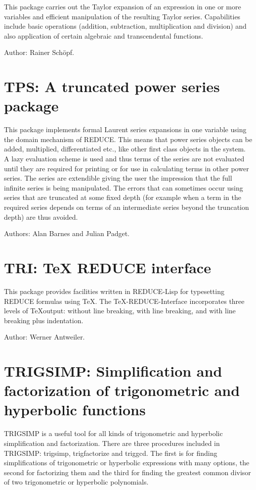 This package carries out the Taylor expansion of an expression in one or
more variables and efficient manipulation of the resulting Taylor series.
Capabilities include basic operations (addition, subtraction,
multiplication and division) and also application of certain algebraic and
transcendental functions.

Author: Rainer Sch\"opf.



\section{TPS: A truncated power series package}  

This package implements formal Laurent series expansions in one variable
using the domain mechanism of REDUCE.  This means that power series
objects can be added, multiplied, differentiated etc.,  like other first
class objects in the system.  A lazy evaluation scheme is used and thus
terms of the series are not evaluated until they are required for printing
or for use in calculating terms in other power series.  The series are
extendible giving the user the impression that the full infinite series is
being manipulated.  The errors that can sometimes occur using series that
are truncated at some fixed depth (for example when a term in the required
series depends on terms of an intermediate series beyond the truncation
depth) are thus avoided.

Authors:  Alan Barnes and Julian Padget.

\section{TRI: TeX REDUCE interface} 

This package provides facilities written in REDUCE-Lisp for typesetting
REDUCE formulas using \TeX.  The \TeX-REDUCE-Interface incorporates three
levels of \TeX output: without line breaking, with line breaking, and
with line breaking plus indentation.

Author: Werner Antweiler.

\section{TRIGSIMP: Simplification and factorization of trigonometric
and hyperbolic functions} 
\label{TRIGSIMP}

TRIGSIMP is a useful tool for all kinds of trigonometric and hyperbolic
simplification and factorization.  There are three procedures included in
TRIGSIMP: trigsimp, trigfactorize and triggcd.  The first is for finding
simplifications of trigonometric or hyperbolic expressions with many
options, the second for factorizing them and the third for finding the
greatest common divisor of two trigonometric or hyperbolic polynomials.

